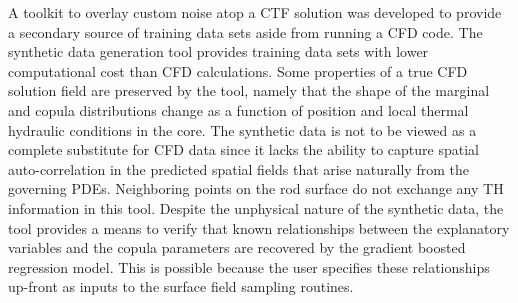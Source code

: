 A toolkit to overlay custom noise atop a CTF solution was developed to provide a secondary source of training data sets aside from running a CFD code.  The synthetic data generation tool provides training data sets with lower computational cost than CFD calculations.  Some properties of a true CFD solution field are preserved by the tool, namely that the shape of the marginal and copula distributions change as a function of position and local thermal hydraulic conditions in the core.  The synthetic data is not to be viewed as a complete substitute for CFD data since it lacks the ability to capture spatial auto-correlation in the predicted spatial fields that arise naturally from the governing PDEs.  Neighboring points on the rod surface do not exchange any TH information in this tool.  Despite the unphysical nature of the synthetic data, the tool provides a means to verify that known relationships between the explanatory variables and the copula parameters are recovered by the gradient boosted regression model.  This is possible because the user specifies these relationships up-front as inputs to the surface field sampling routines. \\

